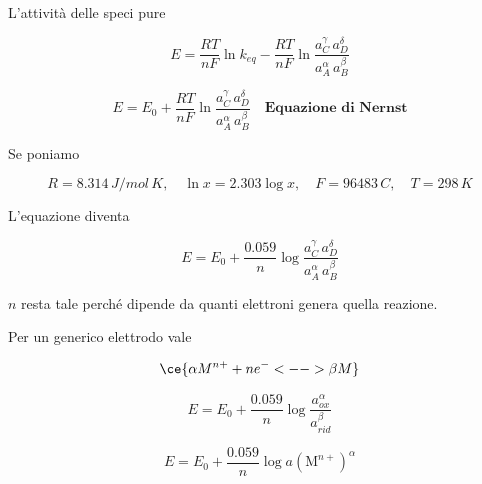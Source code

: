 L'attività delle speci pure

$$E=\frac{RT}{nF}\ln k_{eq} - \frac{RT}{nF}\ln \frac{a_C^{\gamma} \, a_D^{\delta}}{a_A^{\alpha} \, a_B^{\beta}}$$

$$E= E_0 + \frac{RT}{nF}\ln \frac{a_C^{\gamma} \, a_D^{\delta}}{a_A^{\alpha} \, a_B^{\beta}} \quad \textbf{Equazione di Nernst}$$

Se poniamo

$$R=8.314 \, J/mol\,K, \quad \ln x = 2.303 \log x, \quad F=96483 \, C, \quad T=298 \,K$$

L'equazione diventa

$$E = E_0 + \frac{0.059}{n}\log \frac{a_C^{\gamma} \, a_D^{\delta}}{a_A^{\alpha} \, a_B^{\beta}}$$

$n$ resta tale perché dipende da quanti elettroni genera quella reazione.

\vspace{0.2cm}Per un generico elettrodo vale

$$\ce{\alpha M^{n+} + ne^- <--> \beta M}$$

$$E = E_0 + \frac{0.059}{n}\log \frac{a_{ox}^{\alpha}}{a_{rid}^{\beta}}$$

$$E = E_0 + \frac{0.059}{n}\log a(\text{M}^{n+})^{\alpha}$$
